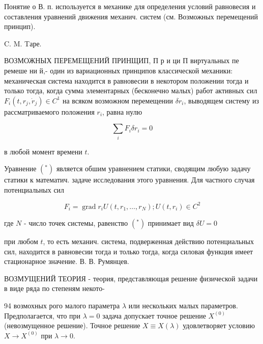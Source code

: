 \documentclass[10pt]{article}
\begin{document}
Понятие о В. п. используется в механике для определения условий равновесия и составления уравнений движения механич. систем (см. Возможных перемещений принцип).



C. M. Tаре.



ВОЗМОЖНЫХ ПЕРЕМЕЩЕНИЙ ПРИНЩИП, П р и ци П виртуальных пе ремеше ни й,- один из вариационных принципов классической механики: механическая система находится в равновесии в некотором положении тогда и только тогда, когда сумма элементарных (бесконечно малых) работ активных сил $F_{i}\left(t, r_{j}, \dot{r}_{j}\right) \in C^{1}$ на всяком возможном перемещении $\delta r_{i}$, выводящем систему из рассматриваемого положения $r_{i}$, равна нулю



\[

\sum_{i} F_{i} \delta r_{i}=0

\]



в любой момент времени $t$.



Уравнение $\left({ }^{*}\right)$ является обшим уравнением статики, сводящим любую задачу статики к математич. задаче исследования этого уравнения. Для частного случая потенциальных сил



\[

F_{i}=\operatorname{grad} r_{i} U\left(t, r_{1}, \ldots, r_{N}\right) ; U\left(t, r_{i}\right) \in C^{2}

\]



где $N$ - число точек системы, равенство $\left({ }^{*}\right)$ принимает вид $\delta U=0$



при любом $t$, то есть механич. система, подверженная действию потенциальных сил, находится в равновесии тогда и только тогда, когда силовая функция имеет стационарное значение. В. В. Румянцев.



ВОЗМУЩЕНИЙ ТЕОРИЯ - теория, представляющая решение физической задачи в виде ряда по степеням некото-



94 возмохных рого малого параметра $\lambda$ или нескольких малых параметров. Предполагается, что при $\lambda=0$ задача допускает точное решение $X^{(0)}$ (невозмущенное решение). Точное решение $X \equiv X(\lambda)$ удовлетворяет условию $X \rightarrow X^{(0)}$ при $\lambda \rightarrow 0$.
\end{document}
